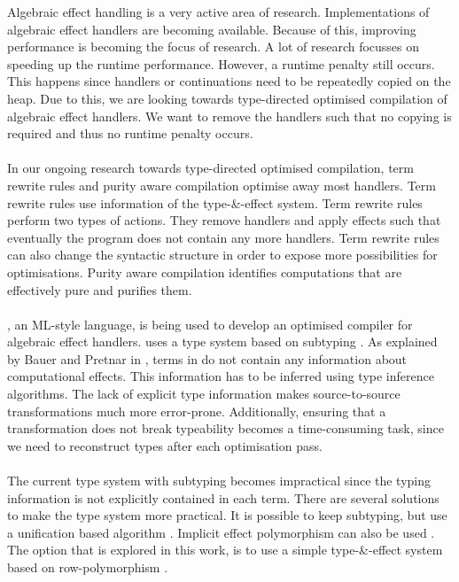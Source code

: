 
\label{intro}
Algebraic effect handling is a very active area of research. Implementations of algebraic effect handlers are becoming available. Because of this, improving performance is becoming the focus of research. A lot of research focusses on speeding up the runtime performance. However, a runtime penalty still occurs. This happens since handlers or continuations need to be repeatedly copied on the heap. Due to this, we are looking towards type-directed optimised compilation of algebraic effect handlers. We want to remove the handlers such that no copying is required and thus no runtime penalty occurs. \\
\\
In our ongoing research towards type-directed optimised compilation, term rewrite rules and purity aware compilation optimise away most handlers. Term rewrite rules use information of the type-\&-effect system. Term rewrite rules perform two types of actions. They remove handlers and apply effects such that eventually the program does not contain any more handlers. Term rewrite rules can also change the syntactic structure in order to expose more possibilities for optimisations. Purity aware compilation identifies computations that are effectively pure and purifies them.  \\
\\
\eff, an ML-style language, is being used to develop an optimised compiler for algebraic effect handlers. \eff uses a type system based on subtyping \cite{effectsystem}. As explained by Bauer and Pretnar in \cite{programming}, terms in \eff do not contain any information about computational effects. This information has to be inferred using type inference algorithms. The lack of explicit type information makes source-to-source transformations much more error-prone. Additionally, ensuring that a transformation does not break typeability becomes a time-consuming task, since we need to reconstruct types after each optimisation pass. \\
\\
The current type system with subtyping becomes impractical since the typing information is not explicitly contained in each term. There are several solutions to make the type system more practical. It is possible to keep subtyping, but use a unification based algorithm \cite{mlsub}. Implicit effect polymorphism can also be used \cite{impliciteff}. The option that is explored in this work, is to use a simple type-\&-effect system based on row-polymorphism \cite{type-directed, leijen2014koka, row}. \\
